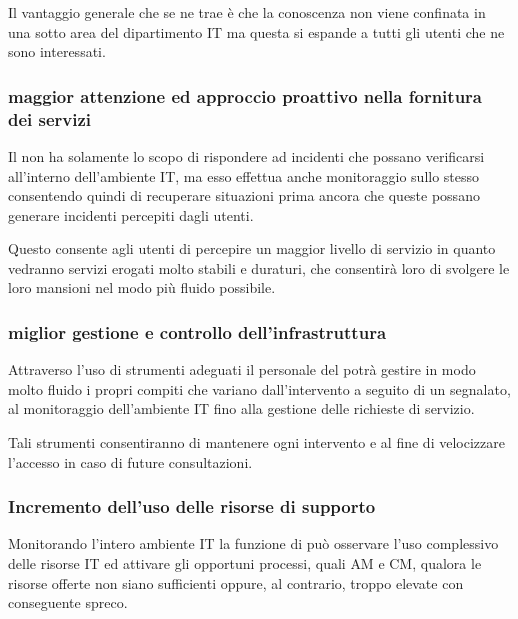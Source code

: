 Il vantaggio generale che se ne trae è che la conoscenza non viene confinata in una sotto area del dipartimento \acs{IT} ma questa si espande a tutti gli utenti che ne sono interessati.

\subsubsection[Maggior attenzione ed approccio proattivo nella fonrnitura dei servizi]{maggior attenzione ed approccio proattivo nella fornitura dei servizi}
Il  non ha solamente lo scopo di rispondere ad incidenti che possano verificarsi all'interno dell'ambiente \acs{IT}, ma esso effettua anche monitoraggio sullo stesso consentendo quindi di recuperare situazioni prima ancora che queste possano generare incidenti percepiti dagli utenti.

Questo consente agli utenti di percepire un maggior livello di servizio in quanto vedranno servizi erogati molto stabili e duraturi, che consentirà loro di svolgere le loro mansioni nel modo più fluido possibile.

\subsubsection[Miglior gestione e controllo dell'infrastruttura]{miglior gestione e controllo dell'infrastruttura}
Attraverso l'uso di strumenti adeguati il personale del  potrà gestire in modo molto fluido i propri compiti che variano dall'intervento a seguito di un  segnalato, al monitoraggio dell'ambiente \acs{IT} fino alla gestione delle richieste di servizio.

Tali strumenti consentiranno di mantenere ogni intervento  e  al fine di velocizzare l'accesso in caso di future consultazioni.

\subsubsection[Incremento dell'uso delle risorse di supporto]{Incremento dell'uso delle risorse di supporto}
Monitorando l'intero ambiente \acs{IT} la funzione di  può osservare l'uso complessivo delle risorse \acs{IT} ed attivare gli opportuni processi, quali \ac{AM} e \ac{CM}, qualora le risorse offerte non siano sufficienti oppure, al contrario, troppo elevate con conseguente spreco.

